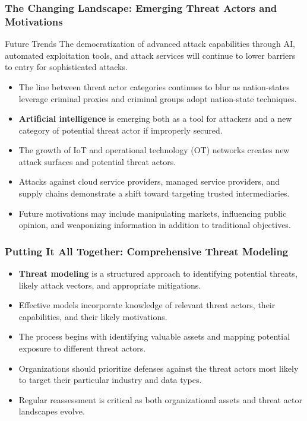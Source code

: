 \documentclass{beamer}
\begin{document}
\begin{frame}
    \frametitle{The Changing Landscape: Emerging Threat Actors and Motivations}
    
    \begin{block}{Future Trends}
        The democratization of advanced attack capabilities through AI, automated exploitation tools, and attack services will continue to lower barriers to entry for sophisticated attacks.
    \end{block}
    
    \begin{itemize}
        \item The line between threat actor categories continues to blur as nation-states leverage criminal proxies and criminal groups adopt nation-state techniques.
        \item \textbf{Artificial intelligence} is emerging both as a tool for attackers and a new category of potential threat actor if improperly secured.
        \item The growth of IoT and operational technology (OT) networks creates new attack surfaces and potential threat actors.
        \item Attacks against cloud service providers, managed service providers, and supply chains demonstrate a shift toward targeting trusted intermediaries.
        \item Future motivations may include manipulating markets, influencing public opinion, and weaponizing information in addition to traditional objectives.
    \end{itemize}
\end{frame}

\begin{frame}
    \frametitle{Putting It All Together: Comprehensive Threat Modeling}
    
    \begin{itemize}
        \item \textbf{Threat modeling} is a structured approach to identifying potential threats, likely attack vectors, and appropriate mitigations.
        \item Effective models incorporate knowledge of relevant threat actors, their capabilities, and their likely motivations.
        \item The process begins with identifying valuable assets and mapping potential exposure to different threat actors.
        \item Organizations should prioritize defenses against the threat actors most likely to target their particular industry and data types.
        \item Regular reassessment is critical as both organizational assets and threat actor landscapes evolve.
    \end{itemize}
\end{frame}
\end{document}
